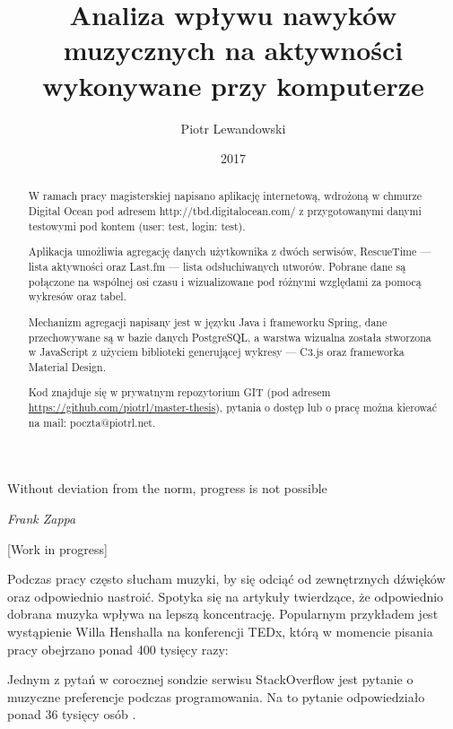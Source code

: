 \documentclass[brudnopis]{xmgr}
\author   {Piotr Lewandowski}
\title    {Analiza wpływu nawyków muzycznych na aktywności wykonywane przy komputerze}
\date     {2017}
\begin{document}
\begin{abstract}
    W ramach pracy magisterskiej napisano aplikację internetową,
    wdrożoną w chmurze Digital Ocean pod adresem http://tbd.digitalocean.com/
    z przygotowanymi danymi testowymi pod kontem (user: test, login: test).

    Aplikacja umożliwia agregację danych użytkownika z dwóch serwisów,
    RescueTime — lista aktywności oraz
    Last.fm — lista odsłuchiwanych utworów.
    Pobrane dane są połączone na wspólnej osi czasu i wizualizowane pod różnymi względami za pomocą wykresów oraz tabel.

    Mechanizm agregacji napisany jest w języku Java i frameworku Spring,
    dane przechowywane są w bazie danych PostgreSQL,
    a warstwa wizualna została stworzona w JavaScript
    z użyciem biblioteki generującej wykresy — C3.js
    oraz frameworka Material Design.

    Kod znajduje się w prywatnym repozytorium GIT (pod adresem \url{https://github.com/piotrl/master-thesis}),
    pytania o dostęp lub o pracę można kierować na mail: poczta@piotrl.net.
\end{abstract}


\maketitle

\introduction

\epigraph{Without deviation from the norm, progress is not possible}{\textit{Frank Zappa}}

[Work in progress]

Podczas pracy często słucham muzyki, by się odciąć od zewnętrznych dźwięków oraz odpowiednio nastroić.
Spotyka się na artykuły twierdzące, że odpowiednio dobrana muzyka wpływa na lepszą koncentrację.
Popularnym przykładem jest wystąpienie Willa Henshalla na konferencji TEDx,
którą w momencie pisania pracy obejrzano ponad 400 tysięcy razy:

Jednym z pytań w corocznej sondzie serwisu StackOverflow jest pytanie o muzyczne preferencje podczas programowania.
Na to pytanie odpowiedziało ponad 36 tysięcy osób \cite{stackoverflow:survey2017}.
\end{document}
